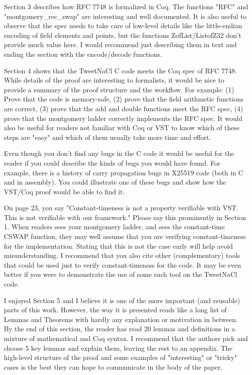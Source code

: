 Section 3 describes how RFC 7748 is formalized in Coq. The functions "RFC" and "montgomery\_rec\_swap" are interesting and well documented. It is also useful to observe that the spec needs to take care of low-level details like the little-endian encoding of field elements and points, but the functions ZofList/ListofZ32 don't provide much value here. I would recommend just describing them in text and ending the section with the encode/decode functions.

Section 4 shows that the TweetNaCl C code meets the Coq spec of RFC 7748. While details of the proof are interesting to formalists, it would be nice to provide a summary of the proof structure and the workflow. For example: (1) Prove that the code is memory-safe, (2) prove that the field arithmetic functions are correct, (3) prove that the add and double functions meet the RFC spec, (4) prove that the montgomery ladder correctly implements the RFC spec. It would also be useful for readers not familiar with Coq or VST to know which of these steps are "easy" and which of them usually take more time and effort.

Even though you don't find any bugs in the C code it would be useful for the reader if you could describe the kinds of bugs you would have found. For example, there is a history of carry propagation bugs in X25519 code (both in C and in assembly). You could illustrate one of these bugs and show how the VST/Coq proof would be able to find it.

On page 23, you say "Constant-timeness is not a property verifiable with VST. This is not verifiable with our framework." Please say this prominently in Section 1. When readers sees your montgomery ladder, and sees the constant-time CSWAP function, they may well assume that you are verifying constant-timeness for the implementation. Stating that this is not the case early will help avoid misunderstanding. I recommend that you also cite other (complementary) tools that could be used just to verify constant-timeness for the code. It may be even better if you were to demonstrate the use of some such tool on the TweetNaCl code.

I enjoyed Section 5 and I believe it is one of the more important (and reusable) parts of this work. However, the way it is presented reads like a long list of Lemmas and Theorems with hardly any explanation or motivation in between. By the end of this section, the reader has read 20 lemmas and definitions in a mixture of mathematical and Coq syntax. I recommend that the authors pick and choose 5 key lemmas and explain them, leaving the rest to an appendix. The high-level structure of the proof and some examples of "interesting" or "tricky" cases is the best they can hope to communicate in the body of the paper.


